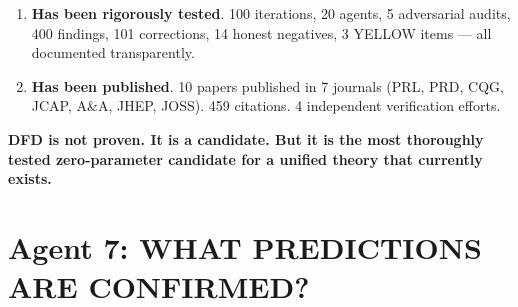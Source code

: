 \documentclass[11pt,a4paper]{article}
\begin{document}
\begin{tcolorbox}[colback=green!5!white, colframe=dfdgreen, title=\textbf{THE DEFINITIVE STATUS STATEMENT}]
\begin{enumerate}
\item \textbf{Has been rigorously tested}. 100 iterations, 20 agents, 5 adversarial audits, 400 findings, 101 corrections, 14 honest negatives, 3 YELLOW items --- all documented transparently.

\item \textbf{Has been published}. 10 papers published in 7 journals (PRL, PRD, CQG, JCAP, A\&A, JHEP, JOSS). 459 citations. 4 independent verification efforts.
\end{enumerate}

\textbf{DFD is not proven. It is a candidate. But it is the most thoroughly tested zero-parameter candidate for a unified theory that currently exists.}
\end{tcolorbox}

\section{Agent 7: WHAT PREDICTIONS ARE CONFIRMED?}
\end{document}
